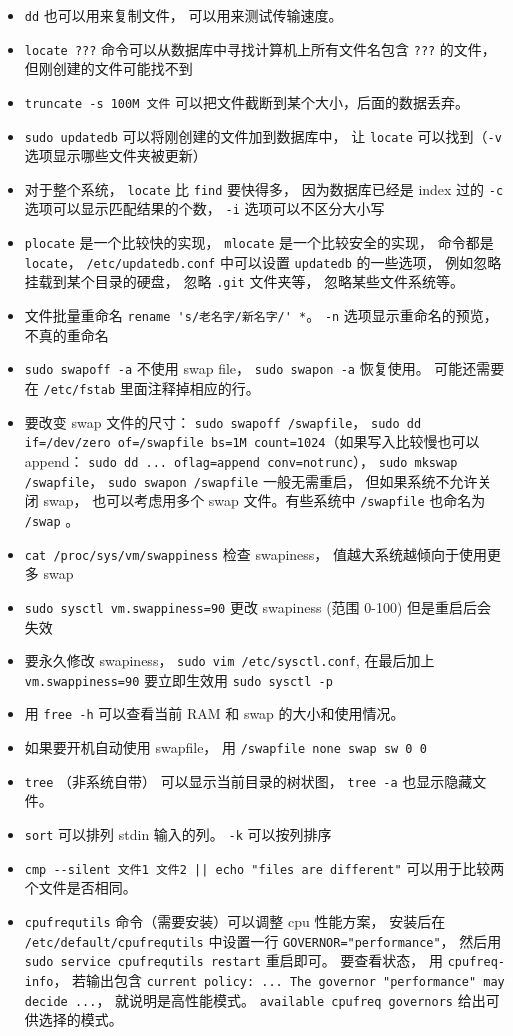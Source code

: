 \begin{itemize}
\item \verb`dd` 也可以用来复制文件， 可以用来测试传输速度。
\item \verb`locate ???` 命令可以从数据库中寻找计算机上所有文件名包含 \verb`???` 的文件， 但刚创建的文件可能找不到
\item \verb`truncate -s 100M 文件` 可以把文件截断到某个大小，后面的数据丢弃。
\item \verb`sudo updatedb` 可以将刚创建的文件加到数据库中， 让 \verb`locate` 可以找到（\verb`-v` 选项显示哪些文件夹被更新）
\item 对于整个系统， \verb`locate` 比 \verb`find` 要快得多， 因为数据库已经是 index 过的 \verb`-c` 选项可以显示匹配结果的个数， \verb`-i` 选项可以不区分大小写
\item \verb`plocate` 是一个比较快的实现， \verb`mlocate` 是一个比较安全的实现， 命令都是 \verb`locate`， \verb`/etc/updatedb.conf` 中可以设置 \verb`updatedb` 的一些选项， 例如忽略挂载到某个目录的硬盘， 忽略 \verb`.git` 文件夹等， 忽略某些文件系统等。
\item 文件批量重命名 \verb`rename 's/老名字/新名字/' *`。 \verb`-n` 选项显示重命名的预览， 不真的重命名
\item \verb`sudo swapoff -a` 不使用 swap file， \verb`sudo swapon -a` 恢复使用。 可能还需要在 \verb`/etc/fstab` 里面注释掉相应的行。
\item 要改变 swap 文件的尺寸： \verb`sudo swapoff /swapfile`， \verb`sudo dd if=/dev/zero of=/swapfile bs=1M count=1024`（如果写入比较慢也可以 append： \verb`sudo dd ... oflag=append conv=notrunc`）， \verb`sudo mkswap /swapfile`， \verb`sudo swapon /swapfile` 一般无需重启， 但如果系统不允许关闭 swap， 也可以考虑用多个 swap 文件。有些系统中 \verb`/swapfile` 也命名为 \verb`/swap` 。
\item \verb`cat /proc/sys/vm/swappiness` 检查 swapiness， 值越大系统越倾向于使用更多 swap
\item \verb`sudo sysctl vm.swappiness=90` 更改 swapiness (范围 0-100) 但是重启后会失效
\item 要永久修改 swapiness， \verb`sudo vim /etc/sysctl.conf`, 在最后加上 \verb`vm.swappiness=90` 要立即生效用 \verb`sudo sysctl -p`
\item 用 \verb`free -h` 可以查看当前 RAM 和 swap 的大小和使用情况。
\item 如果要开机自动使用 swapfile， 用 \verb`/swapfile none swap sw 0 0`
\item \verb`tree` （非系统自带） 可以显示当前目录的树状图， \verb`tree -a` 也显示隐藏文件。
\item \verb`sort` 可以排列 stdin 输入的列。 \verb`-k` 可以按列排序
\item \verb`cmp --silent 文件1 文件2 || echo "files are different"` 可以用于比较两个文件是否相同。
\item \verb`cpufrequtils` 命令（需要安装）可以调整 cpu 性能方案， 安装后在 \verb`/etc/default/cpufrequtils` 中设置一行 \verb`GOVERNOR="performance"`， 然后用 \verb`sudo service cpufrequtils restart` 重启即可。 要查看状态， 用 \verb`cpufreq-info`， 若输出包含 \verb`current policy: ... The governor "performance" may decide ...`， 就说明是高性能模式。 \verb`available cpufreq governors` 给出可供选择的模式。
\end{itemize}

